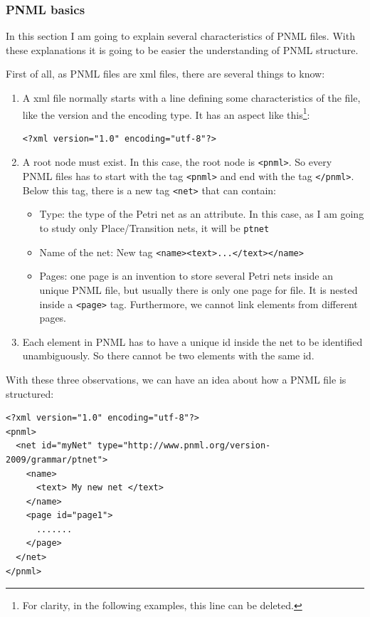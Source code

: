 \subsubsection{PNML basics}

In this section I am going to explain several characteristics of PNML files.
With these explanations it is going to be easier the understanding of PNML
structure.

First of all, as PNML files are xml files, there are several things to know:

\begin{enumerate}
\item 
  A xml file normally starts with a line defining some characteristics of
  the file, like the version and the encoding type. It has an aspect like
  this\footnote{For clarity, in the following examples, this line can be deleted.}: 

\begin{lstlisting}
<?xml version="1.0" encoding="utf-8"?>
\end{lstlisting}
  
 
\item
  A root node must exist.
  In this case, the root node is \texttt{<pnml>}.
  So every PNML files has to start with the tag \texttt{<pnml>} and end with the tag \texttt{</pnml>}.
Below this tag, there is a new tag \texttt{<net>} that can contain:
  \begin{itemize}
  \item Type: the type of the Petri net as an attribute. In this case, as
    I  am going to study only Place/Transition nets, it will  be \texttt{ptnet}
  \item Name of the net: New tag \texttt{<name><text>...</text></name>}
  \item Pages: one page is an invention to store several Petri nets inside
  an unique PNML file, but usually there is only one page for file. It is
  nested inside a \texttt{<page>} tag.
Furthermore, we cannot link elements from different pages.  \end{itemize}
  \item
  Each element in PNML has to have a unique id inside the net to be identified
unambiguously. So there cannot
  be two elements with the same id.
\end{enumerate}

 

With these three observations, we can have an idea about how a PNML file
is structured:  

 
\begin{lstlisting}[label=pnml_net_page,caption=Example of general PNML file]
<?xml version="1.0" encoding="utf-8"?>
<pnml>
  <net id="myNet" type="http://www.pnml.org/version-2009/grammar/ptnet">
    <name>
      <text> My new net </text>
    </name>
    <page id="page1">
      .......
    </page>
  </net>
</pnml>
\end{lstlisting}

